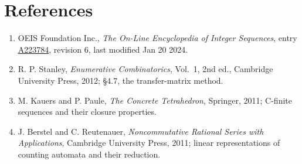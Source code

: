 \documentclass[11pt]{article}
\theoremstyle{definition}
\begin{document}
\section{References}

\begin{enumerate}

\item OEIS Foundation Inc., \emph{The On-Line Encyclopedia of Integer Sequences}, entry \href{https://oeis.org/A223784}{A223784}, revision 6, last modified Jan 20 2024.

\item R. P. Stanley, \emph{Enumerative Combinatorics}, Vol.~1, 2nd ed., Cambridge University Press, 2012; \S4.7, the transfer-matrix method.

\item M. Kauers and P. Paule, \emph{The Concrete Tetrahedron}, Springer, 2011; C-finite sequences and their closure properties.

\item J. Berstel and C. Reutenauer, \emph{Noncommutative Rational Series with Applications}, Cambridge University Press, 2011; linear representations of counting automata and their reduction.

\end{enumerate}
\end{document}
